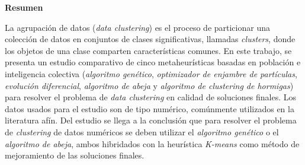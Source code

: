 \vspace{5 mm}

\setcounter{page}{4}
\begin{center}
	{\bf Resumen}
\end{center}

\vspace{5 mm}

La agrupación de datos (\emph{data clustering}) es el proceso de particionar una
colección de datos en conjuntos de clases significativas, llamadas \emph{clusters},
donde los objetos de una clase comparten ca\-rac\-te\-rís\-ti\-cas comunes. En este trabajo,
se presenta un estudio comparativo de cinco metaheurísticas basadas en población
e inteligencia colectiva (\emph{algoritmo genético}, \emph{optimizador de enjambre
de partículas}, \emph{evolución diferencial}, \emph{algoritmo de abeja} y
\emph{algoritmo de clustering de hormigas}) para resolver el problema de \emph{data
clustering} en calidad de soluciones finales. Los datos usados para el estudio son
de tipo numérico, comúnmente utilizados en la literatura afín. Del estudio se
llega a la conclusión que para resolver el problema de \emph{clustering} de datos
numéricos se deben utilizar el \emph{algoritmo genético} o el \emph{algoritmo de
abeja}, ambos hibridados con la heurística \emph{K-means} como método de mejoramiento
de las soluciones finales.

\newpage

